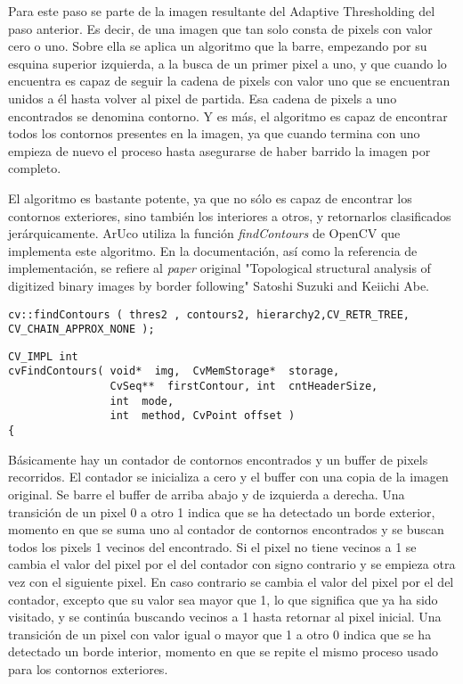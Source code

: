 \documentclass[10pt,a4paper]{article}
\begin{document}
Para este paso se parte de la imagen resultante del Adaptive Thresholding del paso anterior. Es decir, de una imagen que tan solo consta de pixels con valor cero o uno. Sobre ella se aplica un algoritmo que la barre, empezando por su esquina superior izquierda, a la busca de un primer pixel a uno, y que cuando lo encuentra es capaz de seguir la cadena de pixels con valor uno que se encuentran unidos a él hasta volver al pixel de partida. Esa cadena de pixels a uno encontrados se denomina contorno. Y es más, el algoritmo es capaz de encontrar todos los contornos presentes en la imagen, ya que cuando termina con uno empieza de nuevo el proceso hasta asegurarse de haber barrido la imagen por completo.

El algoritmo es bastante potente, ya que no sólo es capaz de encontrar los contornos exteriores, sino también los interiores a otros, y retornarlos clasificados jerárquicamente. ArUco utiliza la función \textit{findContours} de OpenCV que implementa este algoritmo. En la documentación, así como la referencia de implementación, se refiere al \textit{paper} original "Topological structural analysis of digitized binary images by border following"   Satoshi Suzuki and Keiichi Abe.
\begin{lstlisting}[style=C++]
cv::findContours ( thres2 , contours2, hierarchy2,CV_RETR_TREE, CV_CHAIN_APPROX_NONE );
\end{lstlisting} 

\begin{lstlisting}[style=C++]
CV_IMPL int
cvFindContours( void*  img,  CvMemStorage*  storage,
                CvSeq**  firstContour, int  cntHeaderSize,
                int  mode,
                int  method, CvPoint offset )
{
\end{lstlisting} 
Básicamente hay un contador de contornos encontrados y un buffer de pixels recorridos. El contador se inicializa a cero y el buffer con una copia de la imagen original. Se barre el buffer de arriba abajo y de izquierda a derecha. Una transición de un pixel 0 a otro 1 indica que se ha detectado un borde exterior, momento en que se suma uno al contador de contornos encontrados y se buscan todos los pixels 1 vecinos del encontrado. Si el pixel no tiene vecinos a 1 se cambia el valor del pixel por el del contador con signo contrario y se empieza otra vez con el siguiente pixel. En caso contrario se cambia el valor del pixel por el del contador, excepto que su valor sea mayor que 1, lo que significa que ya ha sido visitado, y se continúa buscando vecinos a 1 hasta retornar al pixel inicial. Una transición de un pixel con valor igual o mayor que 1 a otro 0 indica que se ha detectado un borde interior, momento en que se repite el mismo proceso usado para los contornos exteriores.
\end{document}
